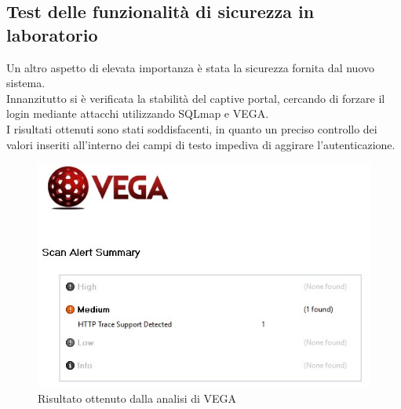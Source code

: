 \documentclass[Realizzazione.tex]{subfiles}
\begin{document}
\subsection{Test delle funzionalità di sicurezza in laboratorio} 
Un altro aspetto di elevata importanza è stata la sicurezza fornita dal nuovo sistema. \\
Innanzitutto si è verificata la stabilità del captive portal, cercando di forzare il login mediante attacchi  utilizzando SQLmap e VEGA. \\
I risultati ottenuti sono stati soddisfacenti, in quanto un preciso controllo dei valori inseriti all'interno dei campi di testo impediva di aggirare l'autenticazione.
\begin{figure}[H]
	\centering
	\includegraphics[width=0.9\linewidth]{"images/vega"}
	\caption{Risultato ottenuto dalla analisi di VEGA}
	\label{fig:Risultato ottenuto dalla analisi di VEGA}
\end{figure}
\end{document}
